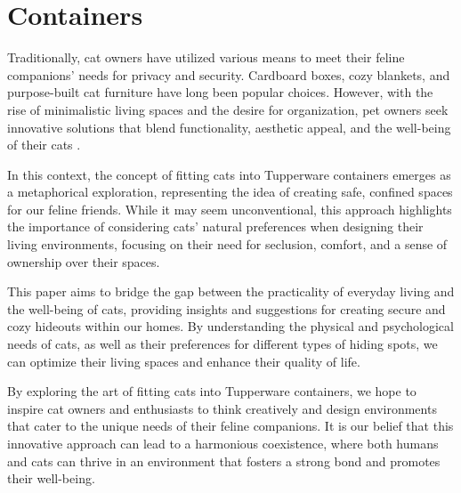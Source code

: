 \section{Containers}

Traditionally, cat owners have utilized various means to meet their feline companions' needs for privacy and security. Cardboard boxes, cozy blankets, and purpose-built cat furniture have long been popular choices. However, with the rise of minimalistic living spaces and the desire for organization, pet owners seek innovative solutions that blend functionality, aesthetic appeal, and the well-being of their cats \cite{tupperware:catcontainer}.

In this context, the concept of fitting cats into Tupperware containers emerges as a metaphorical exploration, representing the idea of creating safe, confined spaces for our feline friends. While it may seem unconventional, this approach highlights the importance of considering cats' natural preferences when designing their living environments, focusing on their need for seclusion, comfort, and a sense of ownership over their spaces.

This paper aims to bridge the gap between the practicality of everyday living and the well-being of cats, providing insights and suggestions for creating secure and cozy hideouts within our homes. By understanding the physical and psychological needs of cats, as well as their preferences for different types of hiding spots, we can optimize their living spaces and enhance their quality of life.

By exploring the art of fitting cats into Tupperware containers, we hope to inspire cat owners and enthusiasts to think creatively and design environments that cater to the unique needs of their feline companions. It is our belief that this innovative approach can lead to a harmonious coexistence, where both humans and cats can thrive in an environment that fosters a strong bond and promotes their well-being.
